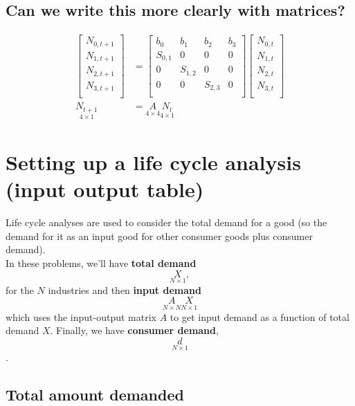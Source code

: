 \documentclass{article}
\begin{document}
\subsection{Can we write this more clearly with matrices?}

\begin{align}
    \begin{bmatrix}
        N_{0, t+1}\\
        N_{1, t+1} \\
        N_{2, t+1} \\
        N_{3, t+1}\\
    \end{bmatrix} &= 
    \begin{bmatrix}
        b_0 & b_1 & b_2 & b_3\\
        S_{0,1} & 0 & 0 &0 \\
        0 & S_{1,2} & 0 &0 \\
        0 & 0 & S_{2,3} &0 \\
    \end{bmatrix}
    \begin{bmatrix}
        N_{0, t}\\
        N_{1, t} \\
        N_{2, t} \\
        N_{3, t}\\
    \end{bmatrix} \\
    \underset{4 \times 1}{N_{t+1}} &= \underset{4 \times 4}{A} \underset{4 \times 1}{N_t}
\end{align}

\section{Setting up a life cycle analysis (input output table)} 
Life cycle analyses are used to consider the total demand for a good (so the demand for it as an input good for other consumer goods plus consumer demand). \\

In these problems, we'll have \textbf{total demand} 
\[\underset{N \times 1}{X},\] 
for the $N$ industries and then \textbf{input demand} 
\[\underset{N \times N}{A} \underset{N \times 1 }{X}\] 
which uses the input-output matrix $A$ to get input demand as a function of total demand $X$. Finally, we have \textbf{consumer demand}, 
\[ \underset{N \times 1}{d}\]. 

\subsection{Total amount demanded}
\end{document}
